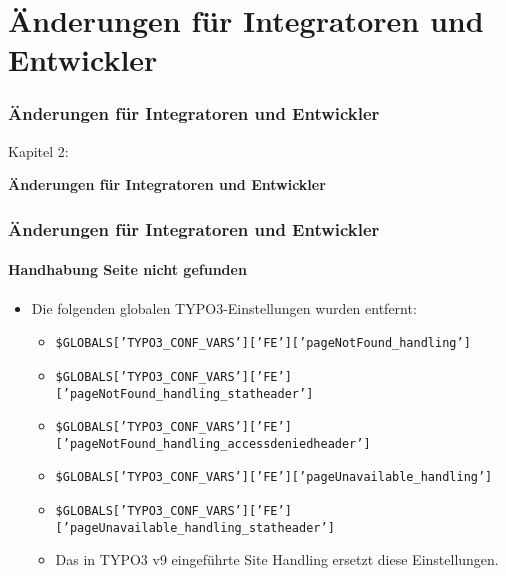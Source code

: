 %

\section{Änderungen für Integratoren und Entwickler}
\begin{frame}[fragile]
	\frametitle{Änderungen für Integratoren und Entwickler}

	\begin{center}\huge{Kapitel 2:}\end{center}
	\begin{center}\huge{\color{typo3darkgrey}\textbf{Änderungen für Integratoren und Entwickler}}\end{center}

\end{frame}


\begin{frame}[fragile]
	\frametitle{Änderungen für Integratoren und Entwickler}
	\framesubtitle{Handhabung Seite nicht gefunden}

	\begin{itemize}

		\item Die folgenden globalen TYPO3-Einstellungen wurden entfernt:

			\begin{itemize}
				\item {\fontsize{7}{8}\selectfont\texttt{\$GLOBALS['TYPO3\_CONF\_VARS']['FE']['pageNotFound\_handling']}}
				\item {\fontsize{7}{8}\selectfont\texttt{\$GLOBALS['TYPO3\_CONF\_VARS']['FE']['pageNotFound\_handling\_statheader']}}
				\item {\fontsize{7}{8}\selectfont\texttt{\$GLOBALS['TYPO3\_CONF\_VARS']['FE']['pageNotFound\_handling\_accessdeniedheader']}}
				\item {\fontsize{7}{8}\selectfont\texttt{\$GLOBALS['TYPO3\_CONF\_VARS']['FE']['pageUnavailable\_handling']}}
				\item {\fontsize{7}{8}\selectfont\texttt{\$GLOBALS['TYPO3\_CONF\_VARS']['FE']['pageUnavailable\_handling\_statheader']}}
			\end{itemize}

			\begin{itemize}\smaller
				\item[\ding{228}] Das in TYPO3 v9 eingeführte Site Handling ersetzt diese Einstellungen.
			\end{itemize}\normalsize

	\end{itemize}

\end{frame}

